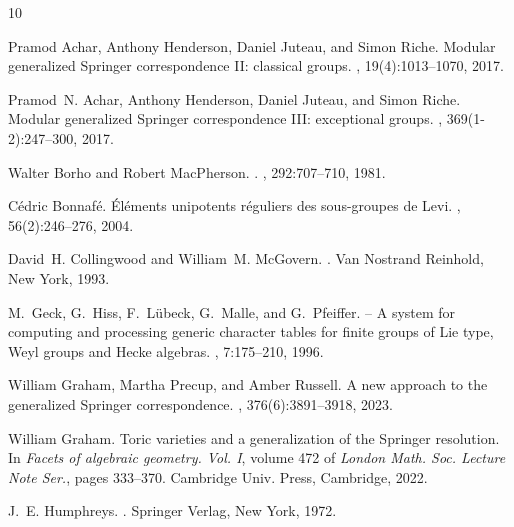 \documentclass[reqno,11pt]{amsart}
\theoremstyle{remark}
\theoremstyle{remark}
\theoremstyle{definition}
\theoremstyle{definition}
\theoremstyle{definition}
\numberwithin{equation}{section}
\begin{document}
\ifx\undefined\bysame
\newcommand{\bysame}{\leavevmode\hbox to3em{\hrulefill}\,}
\fi
\begin{thebibliography}{10}
\newcommand{\etalchar}[1]{$^{#1}$}

Pramod Achar, Anthony Henderson, Daniel Juteau, and Simon Riche.
\newblock Modular generalized {S}pringer correspondence {II}: classical groups.
, 19(4):1013--1070, 2017.

Pramod~N. Achar, Anthony Henderson, Daniel Juteau, and Simon Riche.
\newblock Modular generalized {S}pringer correspondence {III}: exceptional
  groups.
, 369(1-2):247--300, 2017.

Walter Borho and Robert MacPherson.
.
, 292:707--710, 1981.

C\'{e}dric Bonnaf\'{e}.
\newblock \'{E}l\'{e}ments unipotents r\'{e}guliers des sous-groupes de {L}evi.
, 56(2):246--276, 2004.

David~H. Collingwood and William~M. McGovern.
.
\newblock Van Nostrand Reinhold, New York, 1993.

\bibitem[GHL{\etalchar{+}}96]{GH96}
M.~Geck, G.~Hiss, F.~L{\"u}beck, G.~Malle, and G.~Pfeiffer.
 -- {A} system for computing and processing generic
  character tables for finite groups of {L}ie type, {W}eyl groups and {H}ecke
  algebras.
, 7:175--210, 1996.

William Graham, Martha Precup, and Amber Russell.
\newblock A new approach to the generalized {S}pringer correspondence.
, 376(6):3891--3918, 2023.

William Graham.
\newblock Toric varieties and a generalization of the {S}pringer resolution.
\newblock In {\em Facets of algebraic geometry. {V}ol. {I}}, volume 472 of {\em
  London Math. Soc. Lecture Note Ser.}, pages 333--370. Cambridge Univ. Press,
  Cambridge, 2022.

J.~E. Humphreys.
.
\newblock Springer Verlag, New York, 1972.


\end{thebibliography}
\end{document}
